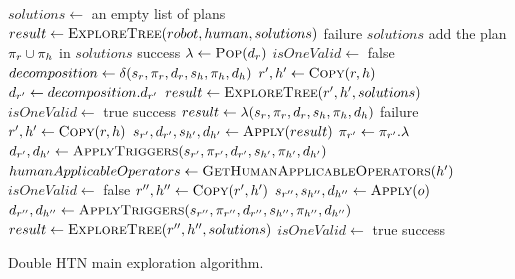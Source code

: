\documentclass[a4paper,11pt,twoside]{StyleThese}
\begin{document}
\begin{algorithm}[H]
\begin{algorithmic}[1]
\State $solutions \leftarrow$ an empty list of plans
\State $result \leftarrow \textsc{ExploreTree}(robot, human, solutions)$
 \Return failure \EndIf
\State \Return $solutions$
\EndFunction
\Statex
{}
	\State add the plan $\pi_r \cup \pi_h$ in $solutions$
	\State \Return success
\EndIf
\State $\lambda \leftarrow \textsc{Pop}(d_r)$
	\State $isOneValid \leftarrow$ false
		\State $decomposition \leftarrow \delta(s_r, \pi_r, d_r, s_h, \pi_h, d_h)$
			\State $r', h' \leftarrow \textsc{Copy}(r, h)$
			\State $d_{r'} \leftarrow decomposition.d_{r'}$
			\State $result \leftarrow \textsc{ExploreTree}(r', h', solutions)$
				$isOneValid \leftarrow$ true
			\EndIf
		\EndIf
	\EndFor
	 \Return success \EndIf
\EndIf
{}
	\State $result \leftarrow \lambda(s_r, \pi_r, d_r, s_h, \pi_h, d_h)$
		\Return failure
	\EndIf
	\State $r', h' \leftarrow \textsc{Copy}(r, h)$
	\State $s_{r'}, d_{r'}, s_{h'}, d_{h'} \leftarrow \textsc{Apply}(result)$
	\State $\pi_{r'} \leftarrow \pi_{r'}.\lambda$
	\State $d_{r'}, d_{h'} \leftarrow \textsc{ApplyTriggers}(s_{r'}, \pi_{r'}, d_{r'}, s_{h'}, \pi_{h'}, d_{h'})$
	\State $humanApplicableOperators \leftarrow \textsc{GetHumanApplicableOperators}(h')$
	\State $isOneValid \leftarrow$ false
		\State $r'', h'' \leftarrow \textsc{Copy}(r', h')$
		\State $s_{r''}, s_{h''}, d_{h''} \leftarrow \textsc{Apply}(o)$
		\State $d_{r''}, d_{h''} \leftarrow \textsc{ApplyTriggers}(s_{r''}, \pi_{r''}, d_{r''}, s_{h''}, \pi_{h''}, d_{h''})$
		\State $result \leftarrow \textsc{ExploreTree}(r'', h'', solutions)$
		 $isOneValid \leftarrow$ true \EndIf
	\EndFor
	 \Return success \EndIf
\EndIf
\EndFunction
\end{algorithmic}
 \caption{Double HTN main exploration algorithm.}
  \label{alg:seek_plans}
\end{algorithm}
\end{document}
